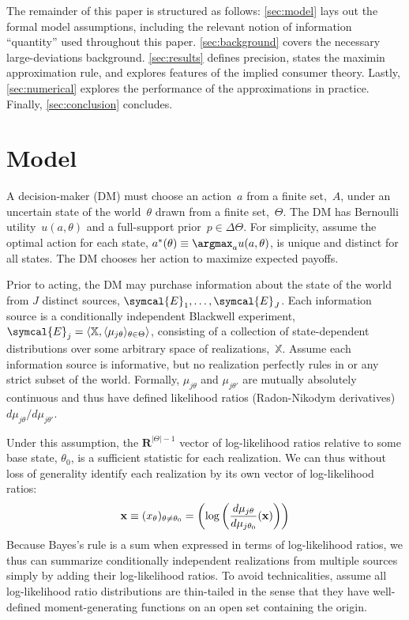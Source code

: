 \documentclass{fancyArticle}
\providecommand{\E}{\symcal{E}}             %
\renewcommand{\|}{\,|\,}                    %
\providecommand{\;}{\,;}                    %
\begin{document}
The remainder of this paper is structured as follows: \autoref{sec:model} lays out the formal model assumptions, including the relevant notion of information ``quantity'' used throughout this paper.
\autoref{sec:background} covers the necessary large-deviations background.
\autoref{sec:results} defines precision, states the maximin approximation rule, and explores features of the implied consumer theory.
Lastly, \autoref{sec:numerical} explores the performance of the approximations in practice.
Finally, \autoref{sec:conclusion} concludes.




\section{Model}
\label{sec:model}

A decision-maker (DM) must choose an action~$a$ from a finite set,~$A$, under an uncertain state of the world~$\theta$ drawn from a finite set,~$\Theta$.
The DM has Bernoulli utility~$u(a, \theta)$ and a full-support prior~$p\in\Delta\Theta$.
For simplicity, assume the optimal action for each state, $a^{*}(\theta)\equiv\argmax_{a}u(a,\theta)$, is unique and distinct for all states.
The DM chooses her action to maximize expected payoffs.

Prior to acting, the DM may purchase information about the state of the world from $J$ distinct sources, $\E_1,\ldots,\E_J$.
Each information source is a conditionally independent Blackwell experiment,
$\E_{j} = \langle\mathbb{X}, \langle \mu_{j\theta}\rangle_{\theta\in\Theta}\rangle$, consisting of a collection of state-dependent distributions over some arbitrary space of realizations,~$\mathbb{X}$.
Assume each information source is informative, but no realization perfectly rules in or any strict subset of the world.
Formally, $\mu_{j\theta}$ and $\mu_{j\theta'}$ are mutually absolutely continuous and thus have defined likelihood ratios (Radon-Nikodym derivatives) $d \mu_{j\theta}/d \mu_{j\theta'}$.

Under this assumption, the $\mathbf{R}^{|\Theta|-1}$ vector of log-likelihood ratios  relative to some base state, $\theta_{0}$, is a sufficient statistic for each realization.
We can thus without loss of generality identify each realization by its own vector of log-likelihood ratios:
\begin{equation*}
  \mathbf{x}\equiv(x_{\theta})_{\theta\neq\theta_0}=\left(
    \log \left( {d \mu_{j\theta} \over d \mu_{j\theta_{0}}}(\mathbf{x}) \right)
  \right)
\end{equation*}
Because Bayes's rule is a sum when expressed in terms of log-likelihood ratios, we thus can summarize conditionally independent realizations from multiple sources simply by adding their log-likelihood ratios.
To avoid technicalities, assume all log-likelihood ratio distributions are thin-tailed in the sense that they have well-defined moment-generating functions on an open set containing the origin.
\end{document}
